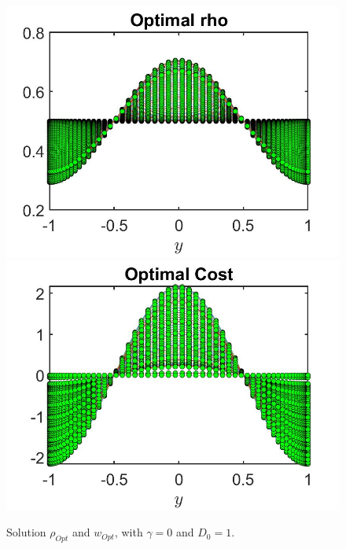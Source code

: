 \documentclass[11pt, a4paper]{article}
\theoremstyle{definition}
\begin{document}
\begin{figure}[h]
	\includegraphics[scale=0.3]{NFrhoOpt0.jpg}
	\includegraphics[scale=0.3]{NFwOpt0.jpg}
	\caption{Solution $\rho_{Opt}$ and $w_{Opt}$, with $\gamma = 0$ and $D_0 = 1$.}
	\label{rhoNF0}
\end{figure}
\end{document}
